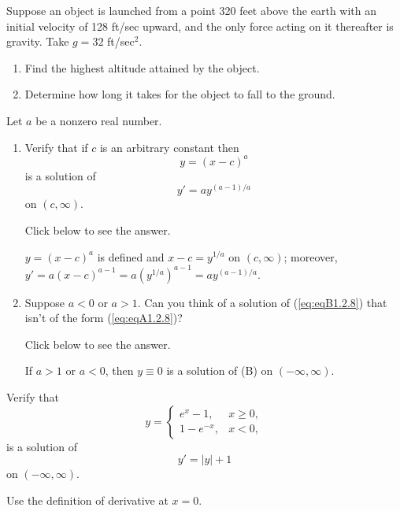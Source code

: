\documentclass{ximera}
\begin{document}
\begin{problem}\label{exer:1.2.7}
Suppose an object is launched from a point 320 feet
above the earth with an initial velocity of 128 ft/sec
upward, and  the only force acting on it thereafter is
gravity. Take $g=32$ ft/sec$^2$.

\begin{enumerate}
\item %
Find the highest altitude attained by the object.

\item %
Determine how long it takes for the object to fall to the
ground.
\end{enumerate}
\end{problem}

\begin{problem}\label{exer:1.2.8}

Let $a$ be a nonzero real number.
\begin{enumerate}
\item %
Verify that if $c$ is an arbitrary constant then
\begin{equation}\label{eq:eqA1.2.8}
y=(x-c)^a 
\end{equation}
is a solution of
\begin{equation}\label{eq:eqB1.2.8}
y'=ay^{(a-1)/a}
\end{equation}
on $(c,\infty)$.

Click below to see the answer.

\begin{expandable}
    $y=(x-c)^a$ is defined and  $x-c=y^{1/a}$ on $(c,\infty)$;
moreover, $y'=a(x-c)^{a-1}=a\left(y^{1/a}\right)^{a-1}=ay^{(a-1)/a}$.
\end{expandable}

\item %
Suppose $a<0$ or $a>1$. Can you think of a solution of
(\ref{eq:eqB1.2.8}) that isn't of the form (\ref{eq:eqA1.2.8})?

Click below to see the answer.

\begin{expandable}
    If $a>1$ or $a<0$, then $y\equiv0$  is a solution of
(B) on $(-\infty,\infty)$.
\end{expandable}
\end{enumerate}
\end{problem}

\begin{problem}\label{exer:1.2.9}
Verify that
$$
y=
\left\{ \begin{array}{cl}
e^x-1,& x \ge 0, \\
1-e^{-x},& x < 0, \end{array}\right.
$$
is a solution of
$$
y'=|y|+1
$$
on $(-\infty,\infty)$. 
\begin{hint}Use the definition of derivative
at $x=0$.
\end{hint}
\end{problem}
\end{document}
